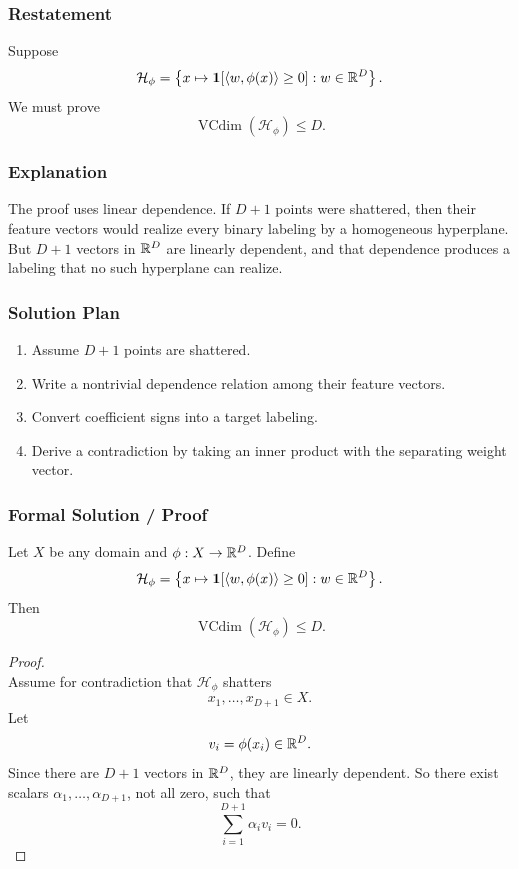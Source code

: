 \documentclass{article}
\newcommand{\vcdim}{\operatorname{VCdim}}
\begin{document}
\begin{solutionbox}

\subsubsection{Restatement}

Suppose
\[
\mathcal{H}_{\phi}
=
\left\{
x\mapsto \mathbf{1}[\langle w,\phi(x)\rangle\ge 0]
:
w\in\mathbb{R}^D
\right\}.
\]
We must prove
\[
\vcdim(\mathcal{H}_{\phi})\le D.
\]

\subsubsection{Explanation}

The proof uses linear dependence. If \(D+1\) points were shattered, then their
feature vectors would realize every binary labeling by a homogeneous hyperplane.
But \(D+1\) vectors in \(\mathbb{R}^D\) are linearly dependent, and that dependence
produces a labeling that no such hyperplane can realize.

\subsubsection{Solution Plan}

\begin{enumerate}[leftmargin=2.5em]
    \item Assume \(D+1\) points are shattered.
    \item Write a nontrivial dependence relation among their feature vectors.
    \item Convert coefficient signs into a target labeling.
    \item Derive a contradiction by taking an inner product with the separating
    weight vector.
\end{enumerate}

\subsubsection{Formal Solution / Proof}

\begin{theorem}
Let \(X\) be any domain and \(\phi:X\to\mathbb{R}^D\). Define
\[
\mathcal{H}_{\phi}
=
\left\{
x\mapsto \mathbf{1}[\langle w,\phi(x)\rangle\ge 0]
:
w\in\mathbb{R}^D
\right\}.
\]
Then
\[
\vcdim(\mathcal{H}_{\phi})\le D.
\]
\end{theorem}

\begin{proof}
\leavevmode\\
Assume for contradiction that \(\mathcal{H}_{\phi}\) shatters
\[
x_1,\dots,x_{D+1}\in X.
\]
Let
\[
v_i=\phi(x_i)\in\mathbb{R}^D.
\]
Since there are \(D+1\) vectors in \(\mathbb{R}^D\), they are linearly dependent. So
there exist scalars \(\alpha_1,\dots,\alpha_{D+1}\), not all zero, such that
\[
\sum_{i=1}^{D+1}\alpha_i v_i=0.
\]


\end{proof}
\end{solutionbox}
\end{document}
